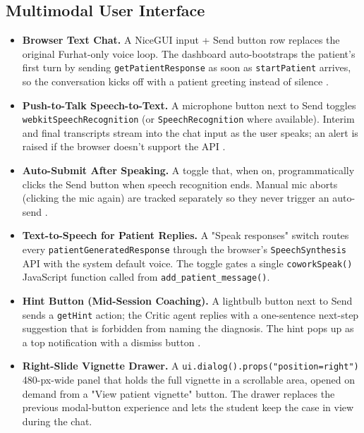 \documentclass{article}
\begin{document}
\subsection{Multimodal User Interface}
\begin{itemize}
    \item \textbf{Browser Text Chat.} A NiceGUI input + Send button row replaces the original Furhat-only voice loop. The dashboard auto-bootstraps the patient's first turn by sending \texttt{getPatientResponse} as soon as \texttt{startPatient} arrives, so the conversation kicks off with a patient greeting instead of silence \cite{Portovaras2024CurrentTA}.

    \item \textbf{Push-to-Talk Speech-to-Text.} A microphone button next to Send toggles \texttt{webkitSpeechRecognition} (or \texttt{SpeechRecognition} where available). Interim and final transcripts stream into the chat input as the user speaks; an alert is raised if the browser doesn't support the API \cite{Beloki2017ASA}.

    \item \textbf{Auto-Submit After Speaking.} A toggle that, when on, programmatically clicks the Send button when speech recognition ends. Manual mic aborts (clicking the mic again) are tracked separately so they never trigger an auto-send \cite{Stokes2015ScalingNA}.

    \item \textbf{Text-to-Speech for Patient Replies.} A "Speak responses" switch routes every \texttt{patientGeneratedResponse} through the browser's \texttt{SpeechSynthesis} API with the system default voice. The toggle gates a single \texttt{coworkSpeak()} JavaScript function called from \texttt{add\_patient\_message()}.

    \item \textbf{Hint Button (Mid-Session Coaching).} A lightbulb button next to Send sends a \texttt{getHint} action; the Critic agent replies with a one-sentence next-step suggestion that is forbidden from naming the diagnosis. The hint pops up as a top notification with a dismiss button \cite{Krugmann2024SentimentAI}.

    \item \textbf{Right-Slide Vignette Drawer.} A \texttt{ui.dialog().props("position=right")} 480-px-wide panel that holds the full vignette in a scrollable area, opened on demand from a "View patient vignette" button. The drawer replaces the previous modal-button experience and lets the student keep the case in view during the chat.


\end{itemize}
\end{document}
